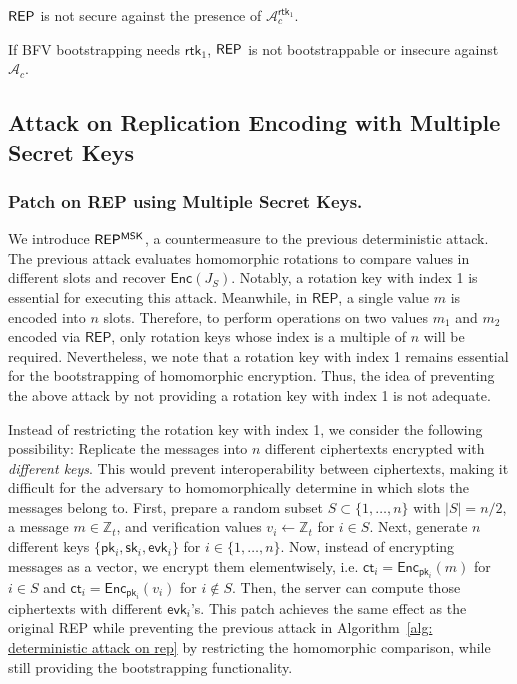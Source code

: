 \documentclass[runningheads]{llncs}
\newcommand{\bb}[1]{\mathbb{#1}}  %
\newcommand{\cc}[1]{\mathcal{#1}} %
\newcommand{\ct}{\textsf{ct}{}}
\newcommand{\sk}{\textsf{sk}{}}
\newcommand{\rtk}{\textsf{rtk}{}}
\newcommand{\evk}{\textsf{evk}}
\newcommand{\pk}{\textsf{pk}{}}
\newcommand{\REP}{\textsf{REP}{}}
\newcommand{\enc}{\textsf{Enc}}
\begin{document}
        \begin{corollary}\label{Cor: Rep}
            $\sf \REP$ is not secure against the presence of $\cc A_c^{\rtk_1}$.
        \end{corollary}
        \begin{corollary}
            If BFV bootstrapping needs $\rtk_1$, $\sf \REP$ is not bootstrappable or insecure against $\cc A_c$.
        \end{corollary}

    \subsection{Attack on Replication Encoding with Multiple Secret Keys}\label{subsec: diff keys}

        \subsubsection{Patch on \REP{} using Multiple Secret Keys.}
        We introduce $\REP^{\sf MSK}$, a countermeasure to the previous deterministic attack. The previous attack evaluates homomorphic rotations to compare values in different slots and recover $\enc(J_S)$. 
        Notably, a rotation key with index 1 is essential for executing this attack. Meanwhile, in $\REP$, a single value $m$ is encoded into $n$ slots. Therefore, to perform operations on two values $m_1$ and $m_2$ encoded via $\REP$, only rotation keys whose index is a multiple of $n$ will be required. Nevertheless, we note that a rotation key with index 1 remains essential for the bootstrapping of homomorphic encryption. Thus, the idea of preventing the above attack by not providing a rotation key with index 1 is not adequate. 
        
        Instead of restricting the rotation key with index 1, we consider the following possibility: Replicate the messages into $n$ different ciphertexts encrypted with \emph{different keys}. This would prevent interoperability between ciphertexts, making it difficult for the adversary to homomorphically determine in which slots the messages belong to.
        First, prepare a random subset $S \subset \{1, \dots, n\}$ with $|S| = n/2$, a message $m \in \bb Z_t$, and verification values $v_i \gets \bb Z_t$ for $i \in S$. 
        Next, generate $n$ different keys $\{\pk_i, \sk_i, \mathsf{evk}_i\}$ for $i \in \{1, \dots, n\}$.
        Now, instead of encrypting messages as a vector, we encrypt them elementwisely, i.e. $\ct_i = \enc_{\pk_i}(m)$ for $i \in S$ and $\ct_i = \enc_{\pk_i}(v_i)$ for $i \notin S$.
        Then, the server can compute those ciphertexts with different $\evk_i$'s.
        This patch achieves the same effect as the original \REP{} while preventing the previous attack in Algorithm~\ref{alg: deterministic attack on rep} by restricting the homomorphic comparison, while still providing the bootstrapping functionality. 
        
\end{document}
